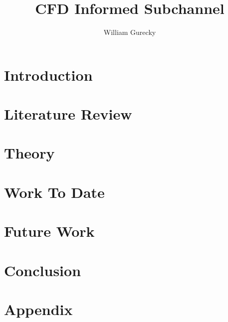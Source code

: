 \documentclass[10pt,a4paper]{report}
\author{William Gurecky}
\title{CFD Informed Subchannel}
\begin{document}




\onehalfspacing
\chapter{Introduction}
\label{chap:intro}


\chapter{Literature Review}
\label{chap:lit}


\chapter{Theory}
\label{chap:theory}


\chapter{Work To Date}
\label{chap:work}


\chapter{Future Work}
\label{chap:fw}

\chapter{Conclusion}
\label{chap:conc}






\chapter{Appendix}

\end{document}
